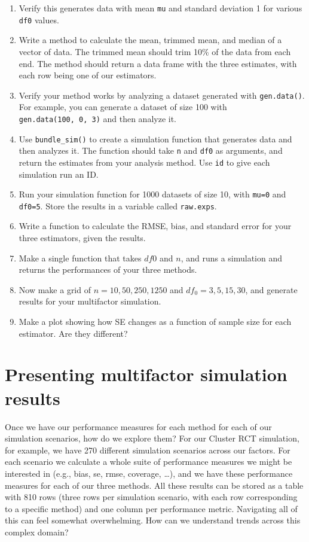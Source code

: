 \documentclass[
]{book}
\begin{document}
\begin{enumerate}
\def\labelenumi{\arabic{enumi})}
\item
  Verify this generates data with mean \texttt{mu} and standard deviation 1 for various \texttt{df0} values.
\item
  Write a method to calculate the mean, trimmed mean, and median of a vector of data.
  The trimmed mean should trim 10\% of the data from each end.
  The method should return a data frame with the three estimates, with each row being one of our estimators.
\item
  Verify your method works by analyzing a dataset generated with \texttt{gen.data()}.
  For example, you can generate a dataset of size 100 with \texttt{gen.data(100,\ 0,\ 3)} and then analyze it.
\item
  Use \texttt{bundle\_sim()} to create a simulation function that generates data and then analyzes it.
  The function should take \texttt{n} and \texttt{df0} as arguments, and return the estimates from your analysis method.
  Use \texttt{id} to give each simulation run an ID.
\item
  Run your simulation function for 1000 datasets of size 10, with \texttt{mu=0} and \texttt{df0=5}.
  Store the results in a variable called \texttt{raw.exps}.
\item
  Write a function to calculate the RMSE, bias, and standard error for your three estimators, given the results.
\item
  Make a single function that takes \(df0\) and \(n\), and runs a simulation and returns the performances of your three methods.
\item
  Now make a grid of \(n =10, 50, 250, 1250\) and \(df_0 =  3, 5, 15, 30\), and generate results for your multifactor simulation.
\item
  Make a plot showing how SE changes as a function of sample size for each estimator. Are they different?
\end{enumerate}

\chapter{Presenting multifactor simulation results}\label{presentation-of-results}

Once we have our performance measures for each method for each of our simulation scenarios, how do we explore them?
For our Cluster RCT simulation, for example, we have 270 different simulation scenarios across our factors.
For each scenario we calculate a whole suite of performance measures we might be interested in (e.g., bias, se, rmse, coverage, \ldots), and we have these performance measures for each of our three methods.
All these results can be stored as a table with 810 rows (three rows per simulation scenario, with each row corresponding to a specific method) and one column per performance metric.
Navigating all of this can feel somewhat overwhelming.
How can we understand trends across this complex domain?
\end{document}
